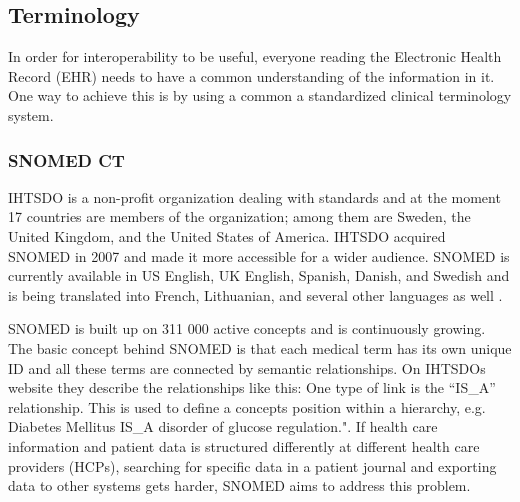 \documentclass[14pt]{article}
\begin{document}




\subsection{Terminology}
\label{sec:TechnicalStandardsTerminology}
In order for interoperability to be useful, everyone reading the Electronic Health Record (\gls{EHR}) needs to have a common understanding of the information in it. One way to achieve this is by using a common a standardized clinical terminology system.

\subsubsection{SNOMED CT}

\gls{IHTSDO} is a non-profit organization dealing with standards and at the moment 17 countries are members of the organization; among them are Sweden, the United Kingdom, and the United States of America. \gls{IHTSDO} acquired \gls{SNOMED} in 2007 and made it more accessible for a wider audience. \gls{SNOMED} is currently available in US English, UK English, Spanish, Danish, and Swedish and is being translated into French, Lithuanian, and several other languages as well \cite{ihtsdolang}.

\gls{SNOMED} is built up on 311 000 active concepts and is continuously growing. The basic concept behind \gls{SNOMED} is that each medical term has its own unique ID and all these terms are connected by semantic relationships. On \gls{IHTSDO}s website they describe the relationships like this: One type of link is the “IS\_A” relationship. This is used to define a concepts position within a hierarchy, e.g. Diabetes Mellitus IS\_A disorder of glucose regulation."\cite{ihtsdocomp}. If health care information and patient data is structured differently at different health care providers (\glspl{HCP}), searching for specific data in a patient journal and exporting data to other systems gets harder, \gls{SNOMED} aims to address this problem.
\end{document}
